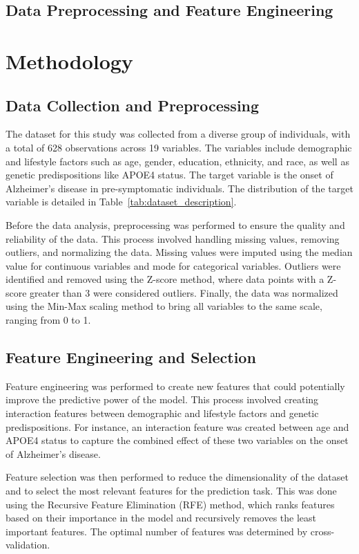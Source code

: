 \documentclass[conference]{IEEEtran}
\begin{document}
\subsection{Data Preprocessing and Feature Engineering}
\section{Methodology}

\subsection{Data Collection and Preprocessing}
The dataset for this study was collected from a diverse group of individuals, with a total of 628 observations across 19 variables. The variables include demographic and lifestyle factors such as age, gender, education, ethnicity, and race, as well as genetic predispositions like APOE4 status. The target variable is the onset of Alzheimer's disease in pre-symptomatic individuals. The distribution of the target variable is detailed in Table~\ref{tab:dataset_description}.

Before the data analysis, preprocessing was performed to ensure the quality and reliability of the data. This process involved handling missing values, removing outliers, and normalizing the data. Missing values were imputed using the median value for continuous variables and mode for categorical variables. Outliers were identified and removed using the Z-score method, where data points with a Z-score greater than 3 were considered outliers. Finally, the data was normalized using the Min-Max scaling method to bring all variables to the same scale, ranging from 0 to 1.

\subsection{Feature Engineering and Selection}
Feature engineering was performed to create new features that could potentially improve the predictive power of the model. This process involved creating interaction features between demographic and lifestyle factors and genetic predispositions. For instance, an interaction feature was created between age and APOE4 status to capture the combined effect of these two variables on the onset of Alzheimer's disease.

Feature selection was then performed to reduce the dimensionality of the dataset and to select the most relevant features for the prediction task. This was done using the Recursive Feature Elimination (RFE) method, which ranks features based on their importance in the model and recursively removes the least important features. The optimal number of features was determined by cross-validation.
\end{document}
